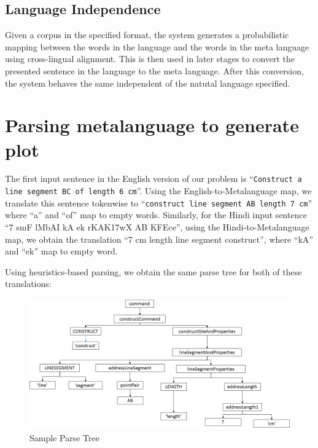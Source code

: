 \def\DevnagVersion{2.15}\documentclass[12pt]{article}
\begin{document}
\subsection{Language Independence}
Given a corpus in the specified format, the system generates a probabilistic mapping between the words in the language and the words in the meta language using cross-lingual alignment. This is then used in later stages to convert the presented sentence in the language to the meta language. After this conversion, the system behaves the same independent of the natutal language specified.

\section{Parsing metalanguage to generate plot}

The first input sentence in the English version of our problem is ``\texttt{Construct a line segment BC of length 6 cm}''. Using the English-to-Metalanguage map, we translate this sentence tokenwise to ``\texttt{construct line segment AB length 7 cm}'' where ``a'' and ``of'' map to empty words. Similarly, for the Hindi input sentence ``7 {\dn s\?mF lMbAI kA ek r\?KAK\317wX} AB {\dn KF{\qva}Ece}'', using the Hindi-to-Metalanguage map, we obtain the translation ``7 cm length line segment construct'', where ``{\dn kA}'' and ``{\dn ek}'' map to empty word.

Using heuristics-based parsing, we obtain the same parse tree for both of these translations:

\begin{figure}[H]
  \begin{center}
    \includegraphics[scale=0.5]{parsetree.png}
  \end{center}
  \caption{Sample Parse Tree}
  \label{}
\end{figure}
\end{document}
